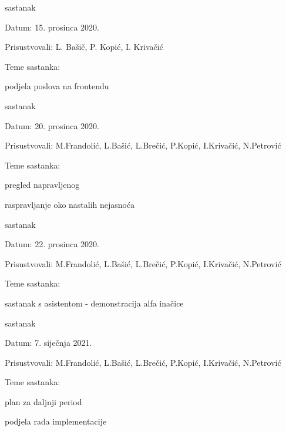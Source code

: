 \begin{packed_enum}
			\item sastanak
			\item[] \begin{packed_item}
				\item Datum: 15. prosinca 2020.
				\item Prisustvovali: L. Bašič, P. Kopić, I. Krivačić
				\item Teme sastanka:
				\begin{packed_item}
					\item podjela poslova na frontendu
				\end{packed_item}
			\end{packed_item}
			
			\item sastanak
			\item[] \begin{packed_item}
				\item Datum: 20. prosinca 2020.
				\item Prisustvovali: M.Frandolić, L.Bašić, L.Brečić, P.Kopić, I.Krivačić, N.Petrović
				\item Teme sastanka:
				\begin{packed_item}
					\item pregled napravljenog
					\item raspravljanje oko nastalih nejasnoća
				\end{packed_item}
			\end{packed_item}
		
			\item sastanak
			\item[] \begin{packed_item}
				\item Datum: 22. prosinca 2020.
				\item Prisustvovali: M.Frandolić, L.Bašić, L.Brečić, P.Kopić, I.Krivačić, N.Petrović
				\item Teme sastanka:
				\begin{packed_item}
					\item sastanak s asistentom - demonstracija alfa inačice
				\end{packed_item}
			\end{packed_item}
		
			\item sastanak
			\item[] \begin{packed_item}
				\item Datum: 7. siječnja 2021.
				\item Prisustvovali: M.Frandolić, L.Bašić, L.Brečić, P.Kopić, I.Krivačić, N.Petrović
				\item Teme sastanka:
				\begin{packed_item}
					\item plan za daljnji period
					\item podjela rada implementacije
				\end{packed_item}
			\end{packed_item}
		

\end{packed_enum}
